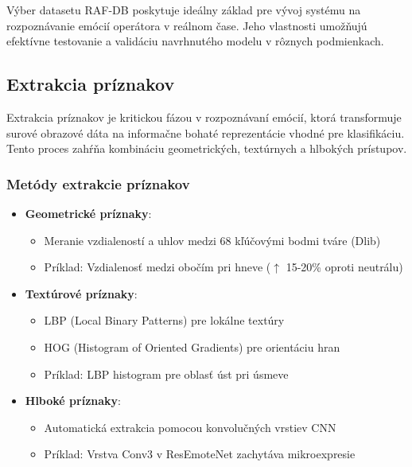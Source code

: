 Výber datasetu RAF-DB poskytuje ideálny základ pre vývoj systému na rozpoznávanie emócií operátora v reálnom čase. Jeho vlastnosti umožňujú efektívne testovanie a validáciu navrhnutého modelu v rôznych podmienkach.

\subsection{Extrakcia príznakov}
Extrakcia príznakov je kritickou fázou v rozpoznávaní emócií, ktorá transformuje surové obrazové dáta na informačne bohaté reprezentácie vhodné pre klasifikáciu. Tento proces zahŕňa kombináciu geometrických, textúrnych a hlbokých prístupov.

\subsubsection{Metódy extrakcie príznakov}
\begin{itemize}
    \item \textbf{Geometrické príznaky}: 
    \begin{itemize}
        \item Meranie vzdialeností a uhlov medzi 68 kľúčovými bodmi tváre (Dlib)
        \item Príklad: Vzdialenosť medzi obočím pri hneve ($\uparrow$ 15-20\% oproti neutrálu)
    \end{itemize}
    
    \item \textbf{Textúrové príznaky}:
    \begin{itemize}
        \item LBP (Local Binary Patterns) pre lokálne textúry
        \item HOG (Histogram of Oriented Gradients) pre orientáciu hran
        \item Príklad: LBP histogram pre oblasť úst pri úsmeve
    \end{itemize}
    
    \item \textbf{Hlboké príznaky}:
    \begin{itemize}
        \item Automatická extrakcia pomocou konvolučných vrstiev CNN
        \item Príklad: Vrstva Conv3 v ResEmoteNet zachytáva mikroexpresie
    \end{itemize}
\end{itemize}

